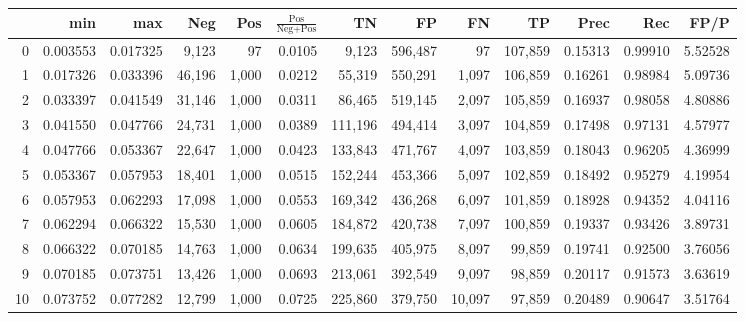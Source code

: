 \begin{tabular}{rrrrrrrrrrrrr}
\toprule
{} &       min &       max &     Neg &    Pos & $\frac{\text{Pos}}{\text{Neg}+\text{Pos}}$ &       TN &       FP &       FN &       TP &     Prec &      Rec &     FP/P \\
\midrule
0   &  0.003553 &  0.017325 &   9,123 &     97 &                                     0.0105 &    9,123 &  596,487 &       97 &  107,859 &  0.15313 &  0.99910 &  5.52528 \\
1   &  0.017326 &  0.033396 &  46,196 &  1,000 &                                     0.0212 &   55,319 &  550,291 &    1,097 &  106,859 &  0.16261 &  0.98984 &  5.09736 \\
2   &  0.033397 &  0.041549 &  31,146 &  1,000 &                                     0.0311 &   86,465 &  519,145 &    2,097 &  105,859 &  0.16937 &  0.98058 &  4.80886 \\
3   &  0.041550 &  0.047766 &  24,731 &  1,000 &                                     0.0389 &  111,196 &  494,414 &    3,097 &  104,859 &  0.17498 &  0.97131 &  4.57977 \\
4   &  0.047766 &  0.053367 &  22,647 &  1,000 &                                     0.0423 &  133,843 &  471,767 &    4,097 &  103,859 &  0.18043 &  0.96205 &  4.36999 \\
5   &  0.053367 &  0.057953 &  18,401 &  1,000 &                                     0.0515 &  152,244 &  453,366 &    5,097 &  102,859 &  0.18492 &  0.95279 &  4.19954 \\
6   &  0.057953 &  0.062293 &  17,098 &  1,000 &                                     0.0553 &  169,342 &  436,268 &    6,097 &  101,859 &  0.18928 &  0.94352 &  4.04116 \\
7   &  0.062294 &  0.066322 &  15,530 &  1,000 &                                     0.0605 &  184,872 &  420,738 &    7,097 &  100,859 &  0.19337 &  0.93426 &  3.89731 \\
8   &  0.066322 &  0.070185 &  14,763 &  1,000 &                                     0.0634 &  199,635 &  405,975 &    8,097 &   99,859 &  0.19741 &  0.92500 &  3.76056 \\
9   &  0.070185 &  0.073751 &  13,426 &  1,000 &                                     0.0693 &  213,061 &  392,549 &    9,097 &   98,859 &  0.20117 &  0.91573 &  3.63619 \\
10  &  0.073752 &  0.077282 &  12,799 &  1,000 &                                     0.0725 &  225,860 &  379,750 &   10,097 &   97,859 &  0.20489 &  0.90647 &  3.51764 \\

\end{tabular}
